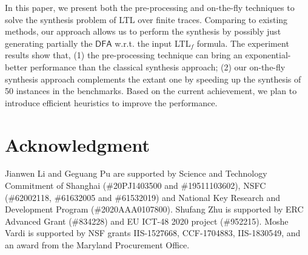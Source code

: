 \documentclass[letterpaper]{article} %
\newcommand{\ltlf}{\textsf{LTL}$_f$\xspace}
\newcommand{\ltl}{\textsf{LTL}\xspace}
\def\dfa{$\mathsf{DFA}$\xspace}
\begin{document}
In this paper, we present both the pre-processing and on-the-fly techniques to solve the synthesis problem of \ltl over finite traces. Comparing to existing methods, our approach allows us to perform the synthesis by possibly just generating partially the \dfa w.r.t. the input \ltlf formula. The experiment results show that, (1) the pre-processing technique can bring an exponential-better performance than the classical synthesis approach; (2) our on-the-fly synthesis approach complements the extant one by speeding up the synthesis of 50 instances in the benchmarks.  
Based on the current achievement, we plan to introduce efficient heuristics to improve the performance.



\section{Acknowledgment}
Jianwen Li and Geguang Pu are supported by  Science and Technology Commitment of Shanghai (\#20PJ1403500 and \#19511103602), NSFC (\#62002118, \#61632005 and \#61532019) and National Key Research and Development Program (\#2020AAA0107800). Shufang Zhu is supported by ERC Advanced Grant (\#834228) and EU ICT-48 2020 project (\#952215). Moshe Vardi is supported by NSF grants IIS-1527668, CCF-1704883,
IIS-1830549, and an award from the Maryland Procurement Office.

%


%
\end{document}
